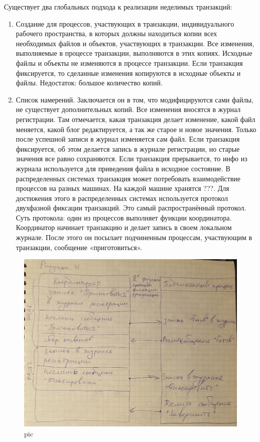 Существует два глобальных подхода к реализации неделимых транзакций:
\begin{enumerate}
    \item Создание для процессов, участвующих в транзакции, индивидуального рабочего пространства, в которых должны находиться копии всех необходимых файлов и объектов, участвующих в транзакции. Все изменения, выполняемые в процессе транзакции, выполняются в этих копиях. Исходные файлы и объекты не изменяются в процессе транзакции. Если транзакция фиксируется, то сделанные изменения копируются в исходные объекты и файлы. Недостаток: большое количество копий.
    \item Список намерений. Заключается он в том, что модифицируются сами файлы, не существует дополнительных копий. Все изменения вносятся в журнал регистрации. Там отмечается, какая транзакция делает изменение, какой файл меняется, какой блог редактируется, а так же старое и новое значения. Только после успешной записи в журнал изменяется сам файл. Если транзакция фиксируется, об этом делается запись в журнале регистрации, но старые значения все равно сохраняются. Если транзакция прерывается, то инфо из журнала используется для приведения файла в исходное состояние. В распределенных системах транзакция может потребовать взаимодействие процессов на разных машинах. На каждой машине хранятся ???. Для достижения этого в распределенных системах используется протокол двухфазной фиксации транзакций. Это самый распространённый протокол. Суть протокола: один из процессов выполняет функции координатора. Координатор начинает транзакцию и делает запись в своем локальном журнале.  После этого он посылает подчиненным процессам, участвующим в транзакции, сообщение «приготовиться».
\end{enumerate} 

\begin{figure}[H]
    \centering
    \includegraphics[width=\textwidth]{pic/4.png}
    \caption{pic}
\end{figure}

